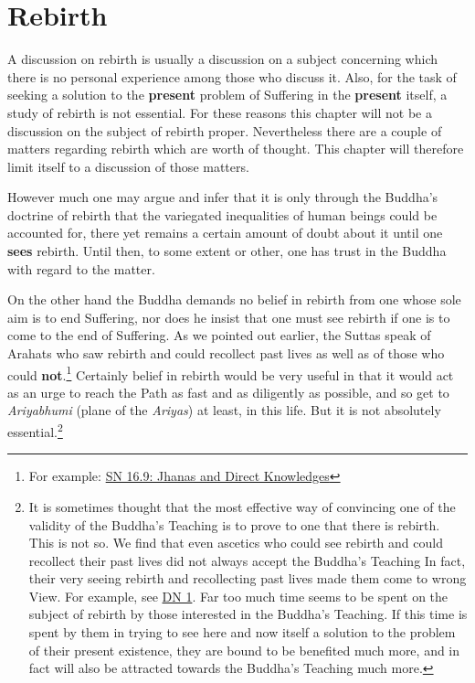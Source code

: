 \chapter{Rebirth}

A discussion on rebirth is usually a discussion on a subject concerning which there is no personal experience among those who discuss it. Also, for the task of seeking a solution to the \textbf{present} problem of Suffering in the \textbf{present} itself, a study of rebirth is not essential. For these reasons this chapter will not be a discussion on the subject of rebirth proper. Nevertheless there are a couple of matters regarding rebirth which are worth of thought. This chapter will therefore limit itself to a discussion of those matters.

However much one may argue and infer that it is only through the Buddha's doctrine of rebirth that the variegated inequalities of human beings could be accounted for, there yet remains a certain amount of doubt about it until one \textbf{sees} rebirth. Until then, to some extent or other, one has trust in the Buddha with regard to the matter.

On the other hand the Buddha demands no belief in rebirth from one whose sole aim is to end Suffering, nor does he insist that one must see rebirth if one is to come to the end of Suffering. As we pointed out earlier, the Suttas speak of Arahats who saw rebirth and could recollect past lives as well as of those who could \textbf{not}.\footnote{For example: \href{https://suttacentral.net/sn16.9/en/bodhi}{SN 16.9: Jhanas and Direct Knowledges}} Certainly belief in rebirth would be very useful in that it would act as an urge to reach the Path as fast and as diligently as possible, and so get to \emph{Ariyabhumi} (plane of the \emph{Ariyas}) at least, in this life. But it is not absolutely essential.\footnote{It is sometimes thought that the most effective way of convincing one of the validity of the Buddha's Teaching is to prove to one that there is rebirth. This is not so. We find that even ascetics who could see rebirth and could recollect their past lives did not always accept the Buddha's Teaching In fact, their very seeing rebirth and recollecting past lives made them come to wrong View. For example, see \href{https://suttacentral.net/dn1/en/bodhi}{DN 1}. Far too much time seems to be spent on the subject of rebirth by those interested in the Buddha's Teaching. If this time is spent by them in trying to see here and now itself a solution to the problem of their present existence, they are bound to be benefited much more, and in fact will also be attracted towards the Buddha's Teaching much more.}

